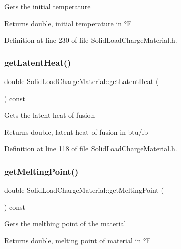 Gets the initial temperature \begin{DoxyReturn}{Returns}
double, initial temperature in °F 
\end{DoxyReturn}


Definition at line 230 of file Solid\+Load\+Charge\+Material.\+h.

\mbox{\label{class_solid_load_charge_material_add60191bd282a9cefa4bf7a60301711b}} 
\subsubsection{\texorpdfstring{get\+Latent\+Heat()}{getLatentHeat()}}
{\footnotesize\ttfamily double Solid\+Load\+Charge\+Material\+::get\+Latent\+Heat (\begin{DoxyParamCaption}{ }\end{DoxyParamCaption}) const\hspace{0.3cm}{\ttfamily [inline]}}

Gets the latent heat of fusion \begin{DoxyReturn}{Returns}
double, latent heat of fusion in btu/lb 
\end{DoxyReturn}


Definition at line 118 of file Solid\+Load\+Charge\+Material.\+h.

\mbox{\label{class_solid_load_charge_material_a4be001f6e6ecbd2ad0ae1d154559cdb0}} 
\subsubsection{\texorpdfstring{get\+Melting\+Point()}{getMeltingPoint()}}
{\footnotesize\ttfamily double Solid\+Load\+Charge\+Material\+::get\+Melting\+Point (\begin{DoxyParamCaption}{ }\end{DoxyParamCaption}) const\hspace{0.3cm}{\ttfamily [inline]}}

Gets the melthing point of the material \begin{DoxyReturn}{Returns}
double, melting point of material in °F 
\end{DoxyReturn}


